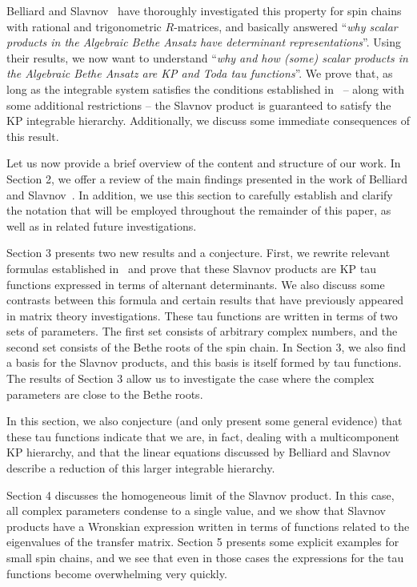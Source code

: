 \documentclass[a4paper,12pt]{amsart}
\begin{document}
Belliard and Slavnov~\cite{Belliard:2019bfz} have thoroughly
investigated this property for spin chains with rational and
trigonometric \(R\)-matrices, and basically answered ``\emph{why
scalar products in the Algebraic Bethe Ansatz have determinant
representations}''. Using their results, we now want to understand
``\emph{why and how (some) scalar products in the Algebraic Bethe
Ansatz are KP and Toda tau functions}''. We prove that, as long as the
integrable system satisfies the conditions established
in~\cite{Belliard:2019bfz} -- along with some additional restrictions
-- the Slavnov product is guaranteed to satisfy the KP integrable
hierarchy. Additionally, we discuss some immediate consequences of
this result.

Let us now provide a brief overview of the content and structure of
our work. In Section 2, we offer a review of the main findings
presented in the work of Belliard and
Slavnov~\cite{Belliard:2019bfz}. In addition, we use this section to
carefully establish and clarify the notation that will be employed
throughout the remainder of this paper, as well as in related future
investigations.

Section 3 presents two new results and a conjecture. First, we rewrite
relevant formulas established in~\cite{Belliard:2019bfz} and prove
that these Slavnov products are KP tau functions expressed in terms of
alternant determinants. We also discuss some contrasts between this
formula and certain results that have previously appeared in matrix
theory investigations.  These tau functions are written in terms of
two sets of parameters. The first set consists of arbitrary complex
numbers, and the second set consists of the Bethe roots of the spin
chain. In Section 3, we also find a basis for the Slavnov products,
and this basis is itself formed by tau functions. The results of
Section 3 allow us to investigate the case where the complex
parameters are close to the Bethe roots.

In this section, we also conjecture (and only present some general
evidence) that these tau functions indicate that we are, in fact,
dealing with a multicomponent KP hierarchy, and that the linear
equations discussed by Belliard and Slavnov~\cite{Belliard:2019bfz}
describe a reduction of this larger integrable hierarchy.

Section 4 discusses the homogeneous limit of the Slavnov product.  In
this case, all complex parameters condense to a single value, and we
show that Slavnov products have a Wronskian expression written in
terms of functions related to the eigenvalues of the transfer matrix.
Section 5 presents some explicit examples for small spin chains, and
we see that even in those cases the expressions for the tau functions
become overwhelming very quickly.
\end{document}
